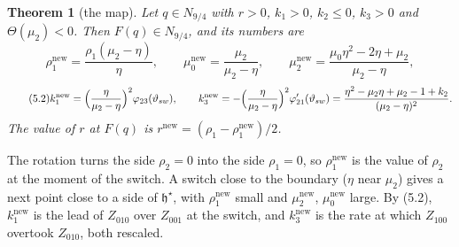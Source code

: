 \documentclass[11pt,a4paper]{article}
\theoremstyle{plain}
\newtheorem{theorem}{Theorem}[section]
\theoremstyle{definition}
\theoremstyle{remark}
\newcommand{\hstar}{\mathfrak{h}^{\star}}
\newcommand{\nw}{^{\mathrm{new}}}
\newcommand{\sw}{_{sw}}
\begin{document}
\begin{theorem}[the map]
Let $q\in N_{9/4}$ with $r>0$, $k_1>0$, $k_2\le0$, $k_3>0$ and $\Theta(\mu_2)<0$. Then
$F(q)\in N_{9/4}$, and its numbers are
\begin{equation}\tag{5.1}
\rho_1\nw=\frac{\rho_1(\mu_2-\eta)}{\eta},\qquad
\mu_0\nw=\frac{\mu_2}{\mu_2-\eta},\qquad
\mu_2\nw=\frac{\mu_0\eta^2-2\eta+\mu_2}{\mu_2-\eta},
\end{equation}
\begin{equation}\tag{5.2}
k_1\nw=\Bigl(\frac{\eta}{\mu_2-\eta}\Bigr)^2\varphi_{23}(\vartheta\sw),\qquad
k_3\nw=-\Bigl(\frac{\eta}{\mu_2-\eta}\Bigr)^2\varphi_{21}'(\vartheta\sw)
=\frac{\eta^2-\mu_2\eta+\mu_2-1+k_2}{(\mu_2-\eta)^2}.
\end{equation}
The value of $r$ at $F(q)$ is $r\nw=(\rho_1-\rho_1\nw)/2$.
\end{theorem}

The rotation turns the side $\rho_2=0$ into the side $\rho_1=0$, so $\rho_1\nw$ is the value of
$\rho_2$ at the moment of the switch. A switch close to
the boundary ($\eta$ near $\mu_2$) gives a next point close to a side of $\hstar$, with
$\rho_1\nw$ small and $\mu_2\nw$, $\mu_0\nw$ large. By (5.2), $k_1\nw$ is the lead of $Z_{010}$
over $Z_{001}$ at the switch, and $k_3\nw$ is the rate at which $Z_{100}$ overtook $Z_{010}$, both
rescaled.
\end{document}
